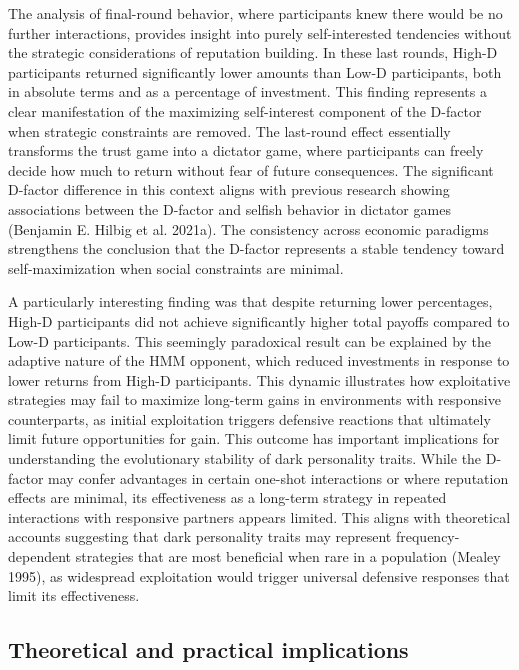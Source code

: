 \documentclass[
]{article}
\begin{document}
The analysis of final-round behavior, where participants knew there would be no further interactions, provides insight into purely self-interested tendencies without the strategic considerations of reputation building. In these last rounds, High-D participants returned significantly lower amounts than Low-D participants, both in absolute terms and as a percentage of investment. This finding represents a clear manifestation of the maximizing self-interest component of the D-factor when strategic constraints are removed.
The last-round effect essentially transforms the trust game into a dictator game, where participants can freely decide how much to return without fear of future consequences. The significant D-factor difference in this context aligns with previous research showing associations between the D-factor and selfish behavior in dictator games (Benjamin E. Hilbig et al. 2021a). The consistency across economic paradigms strengthens the conclusion that the D-factor represents a stable tendency toward self-maximization when social constraints are minimal.

A particularly interesting finding was that despite returning lower percentages, High-D participants did not achieve significantly higher total payoffs compared to Low-D participants. This seemingly paradoxical result can be explained by the adaptive nature of the HMM opponent, which reduced investments in response to lower returns from High-D participants. This dynamic illustrates how exploitative strategies may fail to maximize long-term gains in environments with responsive counterparts, as initial exploitation triggers defensive reactions that ultimately limit future opportunities for gain.
This outcome has important implications for understanding the evolutionary stability of dark personality traits. While the D-factor may confer advantages in certain one-shot interactions or where reputation effects are minimal, its effectiveness as a long-term strategy in repeated interactions with responsive partners appears limited. This aligns with theoretical accounts suggesting that dark personality traits may represent frequency-dependent strategies that are most beneficial when rare in a population (Mealey 1995), as widespread exploitation would trigger universal defensive responses that limit its effectiveness.

\subsection{Theoretical and practical implications}\label{theoretical-and-practical-implications}
\end{document}
